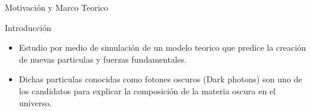 \begin{frame}{}
    \begin{center}
        \LARGE Motivaci\'on y Marco Teorico
    \end{center}
\end{frame}


\begin{frame}{Introducción}
\begin{itemize}
\item Estudio por medio de simulaci\'on de un modelo teorico que predice la creaci\'on de nuevas particulas y fuerzas fundamentales.
\item Dichas particulas conocidas como fotones oscuros (Dark photons) son uno de los candidatos para explicar la composici\'on de la materia oscura en el universo.
\end{itemize}
\end{frame}

